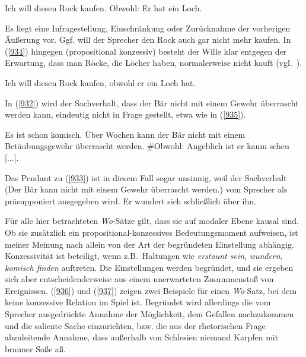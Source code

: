 {\begin{exe}
	\ex\label{933}
	Ich will diesen Rock kaufen. Obwohl: Er hat ein Loch.	     
	\newline    
	\hbox{}\hfill\hbox{\citet[436]{Antomo2013}}
\end{exe}
Es liegt eine Infragestellung, Einschränkung oder Zurücknahme der vorherigen Äußerung vor. Ggf. will der Sprecher den Rock auch gar nicht mehr kaufen. In (\ref{934}) hingegen (propositional konzessiv)  besteht der Wille klar entgegen der Erwartung, dass man Röcke, die Löcher haben, normalerweise nicht kauft (vgl.\ \citealt[436]{Antomo2013}).

\begin{exe}
	\ex\label{934}
	Ich will diesen Rock kaufen, obwohl er ein Loch hat.	   
	\newline      
	\hbox{}\hfill\hbox{\citet[436]{Antomo2013}}
\end{exe}
In (\ref{932}) wird der Sachverhalt, dass der Bär nicht mit einem Gewehr überrascht werden kann, eindeutig nicht in Frage gestellt, etwa wie in (\ref{935}).

\begin{exe}
	\ex\label{935}

	Es ist schon komisch. Über Wochen kann der Bär nicht mit einem Betäubungsgewehr überrascht werden. \#Obwohl: Angeblich ist er kaum scheu [...].	         
\end{exe}
Das Pendant zu (\ref{933}) ist in diesem Fall sogar unsinnig, weil der Sachverhalt (Der Bär kann nicht mit einem Gewehr überrascht werden.) vom Sprecher als präsupponiert  ausgegeben wird. Er wundert sich schließlich über ihn.

Für alle hier betrachteten \textit{Wo}-Sätze gilt, dass sie auf modaler Ebene kausal sind. Ob sie zusätzlich ein propositional-konzessives Bedeutungsmoment aufweisen, ist meiner Meinung nach allein von der Art der begründeten Einstellung abhängig. Konzessivität ist beteiligt, wenn z.B.\ Haltungen wie \textit{erstaunt sein}, \textit{wundern}, \textit{komisch finden} auftreten. Die Einstellungen werden begründet, und sie ergeben sich aber entscheidenderweise aus einem unerwarteten Zusammenstoß von Ereignissen. (\ref{936}) und (\ref{937}) zeigen zwei Beispiele für einen \textit{Wo}-Satz, bei dem keine konzessive Relation im Spiel ist. Begründet wird allerdings die vom Sprecher ausgedrückte Annahme der Möglichkeit, dem Gefallen nachzukommen und die saliente Sache einzurichten, bzw. die aus der rhetorischen Frage abzuleitende Annahme, dass außerhalb von Schlesien niemand Karpfen mit brauner Soße aß.	

}
